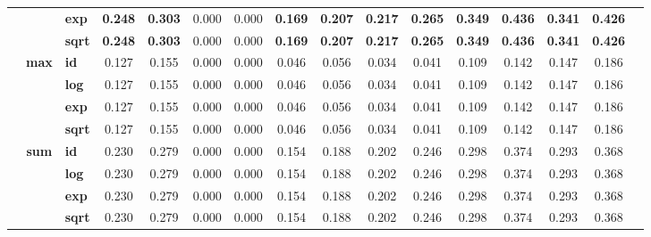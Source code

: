 \begin{table}[t]
{\begin{tabular}{cclccccccccccccc}
            & & \textbf{exp}  & \textbf{0.248} & \textbf{0.303} & 0.000 & 0.000 & \textbf{0.169} & \textbf{0.207} & \textbf{0.217} & \textbf{0.265} & \textbf{0.349} & \textbf{0.436} & \textbf{0.341} & \textbf{0.426} \\
            & & \textbf{sqrt} & \textbf{0.248} & \textbf{0.303} & 0.000 & 0.000 & \textbf{0.169} & \textbf{0.207} & \textbf{0.217} & \textbf{0.265} & \textbf{0.349} & \textbf{0.436} & \textbf{0.341} & \textbf{0.426} \\
        \cmidrule{2-15}
        & \multirow{4}{*}{\textbf{max}}
            & \textbf{id}     & 0.127 & 0.155 & 0.000 & 0.000 & 0.046 & 0.056 & 0.034 & 0.041 & 0.109 & 0.142 & 0.147 & 0.186 \\
            & & \textbf{log}  & 0.127 & 0.155 & 0.000 & 0.000 & 0.046 & 0.056 & 0.034 & 0.041 & 0.109 & 0.142 & 0.147 & 0.186 \\
            & & \textbf{exp}  & 0.127 & 0.155 & 0.000 & 0.000 & 0.046 & 0.056 & 0.034 & 0.041 & 0.109 & 0.142 & 0.147 & 0.186 \\
            & & \textbf{sqrt} & 0.127 & 0.155 & 0.000 & 0.000 & 0.046 & 0.056 & 0.034 & 0.041 & 0.109 & 0.142 & 0.147 & 0.186 \\
        \cmidrule{2-15}
        & \multirow{4}{*}{\textbf{sum}}
            & \textbf{id}     & 0.230 & 0.279 & 0.000 & 0.000 & 0.154 & 0.188 & 0.202 & 0.246 & 0.298 & 0.374 & 0.293 & 0.368 \\
            & & \textbf{log}  & 0.230 & 0.279 & 0.000 & 0.000 & 0.154 & 0.188 & 0.202 & 0.246 & 0.298 & 0.374 & 0.293 & 0.368 \\
            & & \textbf{exp}  & 0.230 & 0.279 & 0.000 & 0.000 & 0.154 & 0.188 & 0.202 & 0.246 & 0.298 & 0.374 & 0.293 & 0.368 \\
            & & \textbf{sqrt} & 0.230 & 0.279 & 0.000 & 0.000 & 0.154 & 0.188 & 0.202 & 0.246 & 0.298 & 0.374 & 0.293 & 0.368 \\
        \midrule


\end{tabular}}
\end{table}
